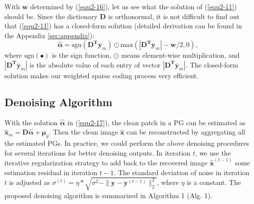 With $\bm{w}$ determined by (\ref{equ2-16}), let us see what the solution of (\ref{equ2-11}) should be. Since the dictionary $\bm{D}$ is orthonormal, it is not difficult to find out that (\ref{equ2-11}) has a closed-form solution (detailed derivation can be found in the Appendix \ref{sec:appendix}):
\begin{equation}\label{equ2-17}
\hat{\bm{\alpha}}= \text{sgn}(\bm{D^{T}\overline{y}}_{m})\odot \text{max}(|\bm{D^{T}\overline{y}}_{m}|-\bm{w}/2,0),
\end{equation}
where $\text{sgn}(\bullet)$ is the sign function, $\odot$ means element-wise multiplication, and $|\bm{D^{T}\overline{y}}_{m}|$ is the absolute value of each entry of vector $|\bm{D^{T}\overline{y}}_{m}|$. The closed-form solution makes our weighted sparse coding process very efficient. 
\subsection{Denoising Algorithm}
With the solution $\hat{\bm{\alpha}}$ in (\ref{equ2-17}), the clean patch in a PG can be estimated as $\hat{\bm{x}}_{m}=\bm{D}\hat{\bm{\alpha}}+\bm{\mu}_{y}$. Then the clean image $\hat{\bm{x}}$ can be reconstructed by aggregating all the estimated PGs. In practice, we could perform the above denoising procedures for several iterations for better denoising outputs. In iteration $t$, we use the iterative regularization strategy \cite{osher2005iterative} to add back to the recovered image $\hat{\bm{x}}^{(t-1)}$ some estimation residual in iteration $t-1$. The standard deviation of noise in iteration $t$ is adjusted as $\sigma^{(t)} = \eta*\sqrt{\sigma^{2}-\|\bm{y}-\bm{y}^{(t-1)}\|_{2}^{2}}$, where $\eta$ is a constant. The proposed denoising algorithm is summarized in Algorithm 1 (Alg. 1).

